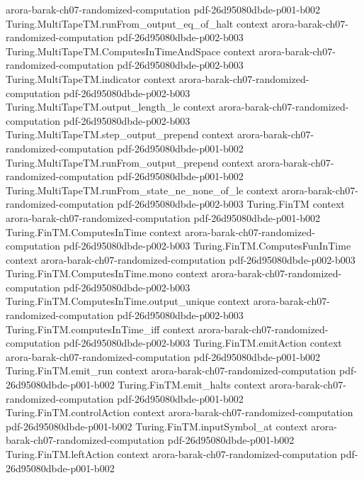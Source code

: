 \begin{theorem}
  {arora-barak-ch07-randomized-computation}
  {pdf-26d95080dbde-p001-b002}
\proofstep
  {Turing.MultiTapeTM.runFrom_output_eq_of_halt}
  {context}
  {arora-barak-ch07-randomized-computation}
  {pdf-26d95080dbde-p002-b003}
\proofstep
  {Turing.MultiTapeTM.ComputesInTimeAndSpace}
  {context}
  {arora-barak-ch07-randomized-computation}
  {pdf-26d95080dbde-p002-b003}
\proofstep
  {Turing.MultiTapeTM.indicator}
  {context}
  {arora-barak-ch07-randomized-computation}
  {pdf-26d95080dbde-p002-b003}
\proofstep
  {Turing.MultiTapeTM.output_length_le}
  {context}
  {arora-barak-ch07-randomized-computation}
  {pdf-26d95080dbde-p002-b003}
\proofstep
  {Turing.MultiTapeTM.step_output_prepend}
  {context}
  {arora-barak-ch07-randomized-computation}
  {pdf-26d95080dbde-p001-b002}
\proofstep
  {Turing.MultiTapeTM.runFrom_output_prepend}
  {context}
  {arora-barak-ch07-randomized-computation}
  {pdf-26d95080dbde-p001-b002}
\proofstep
  {Turing.MultiTapeTM.runFrom_state_ne_none_of_le}
  {context}
  {arora-barak-ch07-randomized-computation}
  {pdf-26d95080dbde-p002-b003}
\proofstep
  {Turing.FinTM}
  {context}
  {arora-barak-ch07-randomized-computation}
  {pdf-26d95080dbde-p001-b002}
\proofstep
  {Turing.FinTM.ComputesInTime}
  {context}
  {arora-barak-ch07-randomized-computation}
  {pdf-26d95080dbde-p002-b003}
\proofstep
  {Turing.FinTM.ComputesFunInTime}
  {context}
  {arora-barak-ch07-randomized-computation}
  {pdf-26d95080dbde-p002-b003}
\proofstep
  {Turing.FinTM.ComputesInTime.mono}
  {context}
  {arora-barak-ch07-randomized-computation}
  {pdf-26d95080dbde-p002-b003}
\proofstep
  {Turing.FinTM.ComputesInTime.output_unique}
  {context}
  {arora-barak-ch07-randomized-computation}
  {pdf-26d95080dbde-p002-b003}
\proofstep
  {Turing.FinTM.computesInTime_iff}
  {context}
  {arora-barak-ch07-randomized-computation}
  {pdf-26d95080dbde-p002-b003}
\proofstep
  {Turing.FinTM.emitAction}
  {context}
  {arora-barak-ch07-randomized-computation}
  {pdf-26d95080dbde-p001-b002}
\proofstep
  {Turing.FinTM.emit_run}
  {context}
  {arora-barak-ch07-randomized-computation}
  {pdf-26d95080dbde-p001-b002}
\proofstep
  {Turing.FinTM.emit_halts}
  {context}
  {arora-barak-ch07-randomized-computation}
  {pdf-26d95080dbde-p001-b002}
\proofstep
  {Turing.FinTM.controlAction}
  {context}
  {arora-barak-ch07-randomized-computation}
  {pdf-26d95080dbde-p001-b002}
\proofstep
  {Turing.FinTM.inputSymbol_at}
  {context}
  {arora-barak-ch07-randomized-computation}
  {pdf-26d95080dbde-p001-b002}
\proofstep
  {Turing.FinTM.leftAction}
  {context}
  {arora-barak-ch07-randomized-computation}
  {pdf-26d95080dbde-p001-b002}

\end{theorem}

